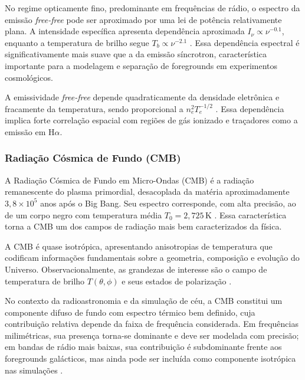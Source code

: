 No regime opticamente fino, predominante em frequências de rádio, o espectro da emissão \textit{free-free} pode ser aproximado por uma lei de potência relativamente plana. A intensidade específica apresenta dependência aproximada \(I_\nu \propto \nu^{-0.1}\), enquanto a temperatura de brilho segue \(T_b \propto \nu^{-2.1}\) \cite{burke2019introduction}. Essa dependência espectral é significativamente mais suave que a da emissão síncrotron, característica importante para a modelagem e separação de foregrounds em experimentos cosmológicos.

A emissividade \textit{free-free} depende quadraticamente da densidade eletrônica e fracamente da temperatura, sendo proporcional a \(n_e^2 T_e^{-1/2}\) \cite{burke2019introduction}. Essa dependência implica forte correlação espacial com regiões de gás ionizado e traçadores como a emissão em H$\alpha$.
\subsubsection{Radiação Cósmica de Fundo (CMB)}

A Radiação Cósmica de Fundo em Micro-Ondas (CMB) é a radiação remanescente do plasma
primordial, desacoplada da matéria aproximadamente \(3{,}8 \times 10^5\) anos após o Big
Bang. Seu espectro corresponde, com alta precisão, ao de um corpo negro com temperatura
média \(T_0 = 2{,}725\,\mathrm{K}\) \cite{burke2019introduction}. Essa característica
torna a CMB um dos campos de radiação mais bem caracterizados da física.

A CMB é quase isotrópica, apresentando anisotropias de temperatura que codificam
informações fundamentais sobre a geometria, composição e evolução do Universo.
Observacionalmente, as grandezas de interesse são o campo de temperatura de brilho
\(T(\theta,\phi)\) e seus estados de polarização \cite{burke2019introduction,
selvaraj2021all}.

No contexto da radioastronomia e da simulação de céu, a CMB constitui um componente
difuso de fundo com espectro térmico bem definido, cuja contribuição relativa depende da
faixa de frequência considerada. Em frequências milimétricas, sua presença torna-se
dominante e deve ser modelada com precisão; em bandas de rádio mais baixas, sua
contribuição é subdominante frente aos foregrounds galácticos, mas ainda pode ser
incluída como componente isotrópica nas simulações \cite{burke2019introduction}.


